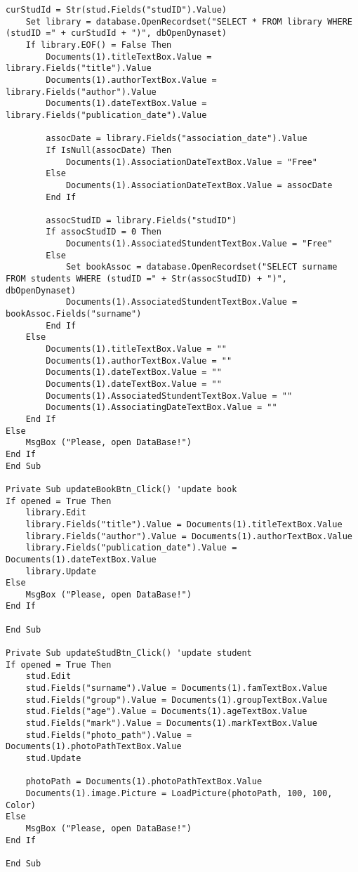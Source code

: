 \begin{lstlisting}[caption=VBA code]
    curStudId = Str(stud.Fields("studID").Value)
    Set library = database.OpenRecordset("SELECT * FROM library WHERE (studID =" + curStudId + ")", dbOpenDynaset)
    If library.EOF() = False Then
        Documents(1).titleTextBox.Value = library.Fields("title").Value
        Documents(1).authorTextBox.Value = library.Fields("author").Value
        Documents(1).dateTextBox.Value = library.Fields("publication_date").Value
        
        assocDate = library.Fields("association_date").Value
        If IsNull(assocDate) Then
            Documents(1).AssociationDateTextBox.Value = "Free"
        Else
            Documents(1).AssociationDateTextBox.Value = assocDate
        End If
        
        assocStudID = library.Fields("studID")
        If assocStudID = 0 Then
            Documents(1).AssociatedStundentTextBox.Value = "Free"
        Else
            Set bookAssoc = database.OpenRecordset("SELECT surname FROM students WHERE (studID =" + Str(assocStudID) + ")", dbOpenDynaset)
            Documents(1).AssociatedStundentTextBox.Value = bookAssoc.Fields("surname")
        End If
    Else
        Documents(1).titleTextBox.Value = ""
        Documents(1).authorTextBox.Value = ""
        Documents(1).dateTextBox.Value = ""
        Documents(1).dateTextBox.Value = ""
        Documents(1).AssociatedStundentTextBox.Value = ""
        Documents(1).AssociatingDateTextBox.Value = ""
    End If
Else
    MsgBox ("Please, open DataBase!")
End If
End Sub

Private Sub updateBookBtn_Click() 'update book
If opened = True Then
    library.Edit
    library.Fields("title").Value = Documents(1).titleTextBox.Value
    library.Fields("author").Value = Documents(1).authorTextBox.Value
    library.Fields("publication_date").Value = Documents(1).dateTextBox.Value
    library.Update
Else
    MsgBox ("Please, open DataBase!")
End If

End Sub

Private Sub updateStudBtn_Click() 'update student
If opened = True Then
    stud.Edit
    stud.Fields("surname").Value = Documents(1).famTextBox.Value
    stud.Fields("group").Value = Documents(1).groupTextBox.Value
    stud.Fields("age").Value = Documents(1).ageTextBox.Value
    stud.Fields("mark").Value = Documents(1).markTextBox.Value
    stud.Fields("photo_path").Value = Documents(1).photoPathTextBox.Value
    stud.Update
    
    photoPath = Documents(1).photoPathTextBox.Value
    Documents(1).image.Picture = LoadPicture(photoPath, 100, 100, Color)
Else
    MsgBox ("Please, open DataBase!")
End If

End Sub
\end{lstlisting}